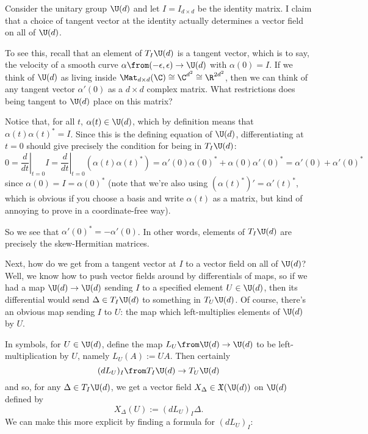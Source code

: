 \begin{example}\label{ex:left invariant vector field}
	Consider the unitary group $\U(d)$ and let $I = I_{d \times d}$ be the identity matrix. I claim that a choice of tangent vector at the identity actually determines a vector field on all of $\U(d)$.
	
	To see this, recall that an element of $T_I \U(d)$ is a tangent vector, which is to say, the velocity of a smooth curve $\alpha \from (-\epsilon, \epsilon) \to \U(d)$ with $\alpha(0) = I$. If we think of $\U(d)$ as living inside $\Mat_{d \times d}(\C) \cong \C^{d^2} \cong \R^{2d^2}$, then we can think of any tangent vector $\alpha'(0)$ as a $d \times d$ complex matrix. What restrictions does being tangent to $\U(d)$ place on this matrix?
	
	Notice that, for all $t$, $\alpha(t) \in \U(d)$, which by definition means that $\alpha(t) \alpha(t)^\ast = I$. Since this is the defining equation of $\U(d)$, differentiating at $t=0$ should give precisely the condition for being in $T_I\U(d)$:
	\[
		0 = \left.\frac{d}{dt}\right|_{t=0} I  = \left. \frac{d}{dt}\right|_{t=0} \left(\alpha(t) \alpha(t)^\ast\right) = \alpha'(0) \alpha(0)^\ast + \alpha(0) \alpha'(0)^\ast = \alpha'(0) + \alpha'(0)^\ast
	\]
	since $\alpha(0) = I = \alpha(0)^\ast$ (note that we're also using $(\alpha(t)^\ast)' = \alpha'(t)^\ast$, which is obvious if you choose a basis and write $\alpha(t)$ as a matrix, but kind of annoying to prove in a coordinate-free way).
	
	So we see that $\alpha'(0)^\ast = -\alpha'(0)$. In other words, elements of $T_I \U(d)$ are precisely the skew-Hermitian matrices.
	
	Next, how do we get from a tangent vector at $I$ to a vector field on all of $\U(d)$? Well, we know how to push vector fields around by differentials of maps, so if we had a map $\U(d) \to \U(d)$ sending $I$ to a specified element $U \in \U(d)$, then its differential would send $\Delta \in T_I \U(d)$ to something in $T_U \U(d)$. Of course, there's an obvious map sending $I$ to $U$: the map which left-multiplies elements of $\U(d)$ by $U$. 
	
	In symbols, for $U \in \U(d)$, define the map $L_U \from \U(d) \to \U(d)$ to be left-multiplication by $U$, namely $L_U(A) := UA$. Then certainly
	\[
		(d L_U)_I \from T_I \U(d) \to T_U \U(d)
	\]
	and so, for any $\Delta \in T_I \U(d)$, we get a vector field $X_\Delta \in \mathfrak{X}(\U(d))$ on $\U(d)$ defined by
	\[
		X_\Delta(U) := (d L_U)_I \Delta.
	\]
	We can make this more explicit by finding a formula for $(d L_U)_I$:
	

\end{example}
